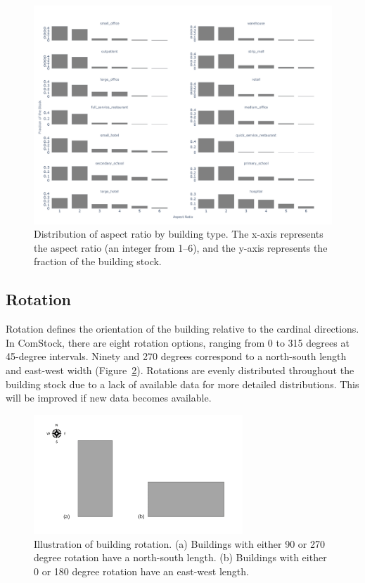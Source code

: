 \begin{figure}[H]
    \centering \includegraphics[width=1.0\textwidth]{figures/aspect_ratio.png}
    \caption[Distribution of aspect ratio by building type]{Distribution of aspect ratio by building type. The x-axis represents the aspect ratio (an integer from 1--6), and the y-axis represents the fraction of the building stock.}
    \label{fig:aspect_ratio_dist}
\end{figure}

\pagebreak

\subsection{Rotation}
Rotation defines the orientation of the building relative to the cardinal directions. In ComStock, there are eight rotation options, ranging from 0 to 315 degrees at 45-degree intervals. Ninety and 270 degrees correspond to a north-south length and east-west width (Figure~\ref{fig:rotation}). Rotations are evenly distributed throughout the building stock due to a lack of available data for more detailed distributions. This will be improved if new data becomes available.

\begin{figure}[H]
    \centering \includegraphics[width=0.7\textwidth]{figures/rotation_example.png}
    \caption[Building rotation]{Illustration of building rotation. (a) Buildings with either 90 or 270 degree rotation have a north-south length. (b) Buildings with either 0 or 180 degree rotation have an east-west length.}
    \label{fig:rotation}
\end{figure}

